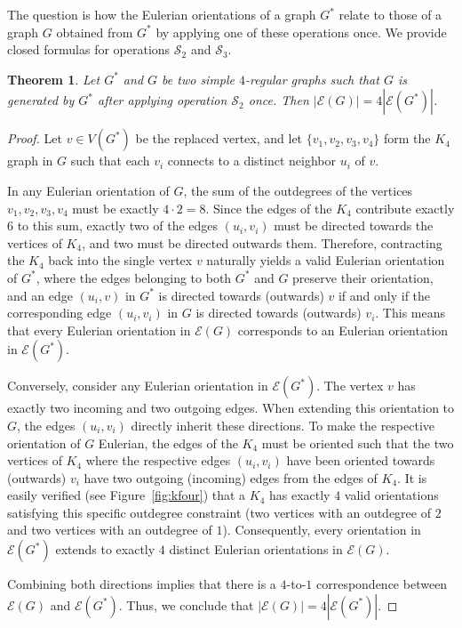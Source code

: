 \documentclass{article}
\newtheorem{theorem}{Theorem}
\begin{document}
        The question is how the Eulerian orientations of a graph $G^*$ relate to those of a graph $G$ obtained from $G^*$ by applying one of these operations once. 
        We provide closed formulas for operations $\mathcal{S}_2$ and $\mathcal{S}_3$.
        
        \begin{theorem}
            Let $G^*$ and $G$ be two simple $4$-regular graphs such that $G$ is generated by $G^*$ after applying operation $\mathcal{S}_2$ once. 
            Then $|\mathcal{E}(G)|=4|\mathcal{E}(G^*)|$.
        \end{theorem}
        
        
        \begin{proof}
            Let $v \in V(G^*)$ be the replaced vertex, and let $\{v_1, v_2, v_3, v_4\}$ form the $K_4$ graph in $G$ such that each $v_i$ connects to a distinct neighbor $u_i$ of $v$. 
            
            In any Eulerian orientation of $G$, the sum of the outdegrees of the vertices $v_1, v_2, v_3, v_4$ must be exactly $4 \cdot 2 = 8$. 
            Since the edges of the $K_4$ contribute exactly $6$ to this sum, exactly two of the edges $(u_i, v_i)$ must be directed towards the vertices of $K_4$, and two must be directed outwards them. 
            Therefore, contracting the $K_4$ back into the single vertex $v$ naturally yields a valid Eulerian orientation of $G^*$, where the edges belonging to both $G^*$ and $G$ preserve their orientation, and an edge $(u_i,v)$ in $G^*$ is directed towards (outwards) $v$ if and only if the corresponding edge $(u_i,v_i)$ in $G$ is directed towards (outwards) $v_i$.
            This means that every Eulerian orientation in $\mathcal{E}(G)$ corresponds to an Eulerian orientation in $\mathcal{E}(G^*)$.
            
            Conversely, consider any Eulerian orientation in $\mathcal{E}(G^*)$. 
            The vertex $v$ has exactly two incoming and two outgoing edges. 
            When extending this orientation to $G$, the edges $(u_i, v_i)$ directly inherit these directions. 
            To make the respective orientation of $G$ Eulerian, the edges of the $K_4$ must be oriented such that the two vertices of $K_4$ where the respective edges $(u_i,v_i)$ have been oriented towards (outwards) $v_i$ have two outgoing (incoming) edges from the edges of $K_4$.
            It is easily verified (see Figure~\ref{fig:kfour}) that a $K_4$ has exactly $4$ valid orientations satisfying this specific outdegree constraint (two vertices with an outdegree of $2$ and two vertices with an outdegree of $1$). 
            Consequently, every orientation in $\mathcal{E}(G^*)$ extends to exactly $4$ distinct Eulerian orientations in $\mathcal{E}(G)$.
            
            Combining both directions implies that there is a $4$-to-$1$ correspondence between $\mathcal{E}(G)$ and $\mathcal{E}(G^*)$.
            Thus, we conclude that $|\mathcal{E}(G)| = 4|\mathcal{E}(G^*)|$.
        
        \end{proof}
\end{document}
